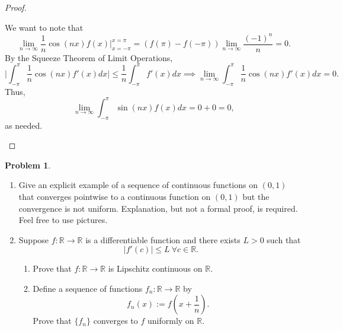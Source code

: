 \documentclass[12pt]{article}
\theoremstyle{definition}
\newtheorem{problem}{Problem}
\begin{document}
\begin{proof}
\begin{enumerate}[label=(\alph*)]
\[        \]
        We want to note that
        \[
            \lim_{n \to \infty} \frac{1}{n}\cos(nx)f(x) \bigg\vert_{x = -\pi}^{x = \pi} = (f(\pi) - f(-\pi)) \lim_{n \to \infty} \frac{(-1)^n}{n} = 0.
        \]
        By the Squeeze Theorem of Limit Operations,
        \[
            \bigg\vert \int_{-\pi}^{\pi} \frac{1}{n}\cos(nx)f'(x) dx \bigg\vert \leq \frac{1}{n} \int_{-\pi}^{\pi} f'(x) dx \implies \lim_{n \to \infty} \int_{-\pi}^{\pi}\frac{1}{n}\cos(nx)f'(x)dx = 0.
        \]
        Thus,
        \[
            \lim_{n \to \infty} \int_{-\pi}^{\pi} \sin(nx)f(x) dx = 0 + 0 = 0,
        \]
        as needed.
    \end{enumerate}
\end{proof}

\begin{problem}
    \hfill
    \begin{enumerate}[label=(\alph*)]
        \item Give an explicit example of a sequence of continuous functions on \((0, 1)\) that converges pointwise to a continuous function on \((0, 1)\) but the convergence is not uniform. Explanation, but not a formal proof, is required. Feel free to use pictures.
        \item Suppose \(f : \mathbb{R} \to \mathbb{R}\) is a diﬀerentiable function and there exists \(L > 0\) such that
        \[
            \vert f'(c) \vert \leq L \ \forall c \in \mathbb{R}. 
        \]
        \begin{enumerate}[label=(\roman*)]
            \item Prove that \(f : \mathbb{R} \to \mathbb{R}\) is Lipschitz continuous on \(\mathbb{R}\).
            \item Define a sequence of functions \(f_n : \mathbb{R} \to \mathbb{R}\) by
            \[
                f_n(x) := f\left(x + \frac{1}{n}\right).
            \]
            Prove that \(\{f_n\}\) converges to \(f\) uniformly on \(\mathbb{R}\).
        \end{enumerate}
    \end{enumerate}
\end{problem}
\end{document}

